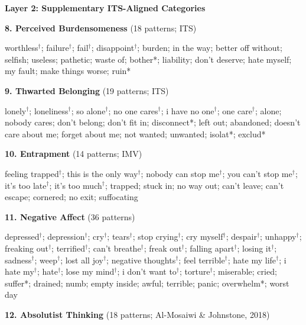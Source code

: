 \documentclass[review,12pt,authoryear]{elsarticle}
\begin{document}
\bigskip
\begin{center}\large\textbf{Layer 2: Supplementary ITS-Aligned Categories}\end{center}
\medskip

\noindent\normalsize\textbf{8. Perceived Burdensomeness} (18 patterns; ITS)

\noindent\small worthless$^\dagger$; failure$^\dagger$; fail$^\dagger$; disappoint$^\dagger$; burden; in the way; better off without; selfish; useless; pathetic; waste of; bother*; liability; don't deserve; hate myself; my fault; make things worse; ruin*

\bigskip

\noindent\normalsize\textbf{9. Thwarted Belonging} (19 patterns; ITS)

\noindent\small lonely$^\dagger$; loneliness$^\dagger$; so alone$^\dagger$; no one cares$^\dagger$; i have no one$^\dagger$; one care$^\dagger$; alone; nobody cares; don't belong; don't fit in; disconnect*; left out; abandoned; doesn't care about me; forget about me; not wanted; unwanted; isolat*; exclud*

\bigskip

\noindent\normalsize\textbf{10. Entrapment} (14 patterns; IMV)

\noindent\small feeling trapped$^\dagger$; this is the only way$^\dagger$; nobody can stop me$^\dagger$; you can't stop me$^\dagger$; it's too late$^\dagger$; it's too much$^\dagger$; trapped; stuck in; no way out; can't leave; can't escape; cornered; no exit; suffocating

\bigskip

\noindent\normalsize\textbf{11. Negative Affect} (36 patterns)

\noindent\small depressed$^\dagger$; depression$^\dagger$; cry$^\dagger$; tears$^\dagger$; stop crying$^\dagger$; cry myself$^\dagger$; despair$^\dagger$; unhappy$^\dagger$; freaking out$^\dagger$; terrified$^\dagger$; can't breathe$^\dagger$; freak out$^\dagger$; falling apart$^\dagger$; losing it$^\dagger$; sadness$^\dagger$; weep$^\dagger$; lost all joy$^\dagger$; negative thoughts$^\dagger$; feel terrible$^\dagger$; hate my life$^\dagger$; i hate my$^\dagger$; hate$^\dagger$; lose my mind$^\dagger$; i don't want to$^\dagger$; torture$^\dagger$; miserable; cried; suffer*; drained; numb; empty inside; awful; terrible; panic; overwhelm*; worst day

\bigskip

\noindent\normalsize\textbf{12. Absolutist Thinking} (18 patterns; Al-Mosaiwi \& Johnstone, 2018)
\end{document}
